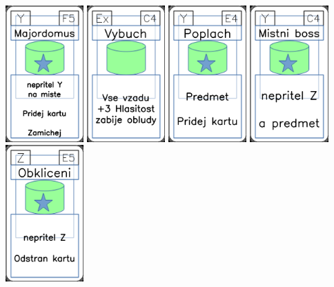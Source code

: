 \documentclass[a4paper]{article}
\begin{document}
	\includegraphics[width=3.0cm]{img-5_29}
	\includegraphics[width=3.0cm]{img-4_13}
	\includegraphics[width=3.0cm]{img-5_23}
	\includegraphics[width=3.0cm]{img-5_43}
	\includegraphics[width=3.0cm]{img-5_54}
\end{document}
